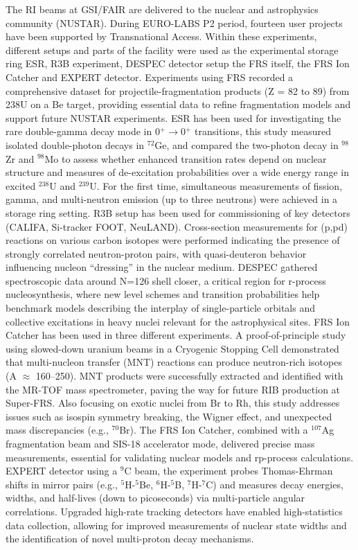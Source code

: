 The RI beams at GSI/FAIR are delivered to the nuclear and astrophysics community (NUSTAR). During EURO-LABS P2 period, fourteen user projects have been supported by Transnational Access. Within these experiments, different setups and parts of the facility were used as the experimental storage ring ESR, R3B experiment, DESPEC detector setup the FRS itself, the FRS Ion Catcher and EXPERT detector. Experiments using FRS recorded a comprehensive dataset for projectile-fragmentation products (Z = 82 to 89) from 238U on a Be target, providing essential data to refine fragmentation models and support future NUSTAR experiments. ESR has been used for investigating the rare double-gamma decay mode in 0$^+$$\rightarrow$0$^+$ transitions, this study measured isolated double-photon decays in $^{72}$Ge, and compared the two-photon decay in $^{98}$Zr and $^{98}$Mo to assess whether enhanced transition rates depend on nuclear structure and measures of de-excitation probabilities over a wide energy range in excited $^{238}$U and $^{239}$U. For the first time, simultaneous measurements of fission, gamma, and multi-neutron emission (up to three neutrons) were achieved in a storage ring setting. R3B setup has been used for commissioning of key detectors (CALIFA, Si-tracker FOOT, NeuLAND). Cross-section measurements for (p,pd) reactions on various carbon isotopes were performed indicating the presence of strongly correlated neutron-proton pairs, with quasi-deuteron behavior influencing nucleon “dressing” in the nuclear medium. DESPEC gathered spectroscopic data around N=126 shell closer, a critical region for r-process nucleosynthesis, where new level schemes and transition probabilities help benchmark models describing the interplay of single-particle orbitals and collective excitations in heavy nuclei relevant for the astrophysical sites. FRS Ion Catcher has been used in three different experiments. A proof-of-principle study using slowed-down uranium beams in a Cryogenic Stopping Cell demonstrated that multi-nucleon transfer (MNT) reactions can produce neutron-rich isotopes (A $\approx$ 160–250). MNT products were successfully extracted and identified with the MR-TOF mass spectrometer, paving the way for future RIB production at Super-FRS. Also focusing on exotic nuclei from Br to Rh, this study addresses issues such as isospin symmetry breaking, the Wigner effect, and unexpected mass discrepancies (e.g., $^{70}$Br). The FRS Ion Catcher, combined with a $^{107}$Ag fragmentation beam and SIS-18 accelerator mode, delivered precise mass measurements, essential for validating nuclear models and rp-process calculations. EXPERT detector using a $^9$C beam, the experiment probes Thomas-Ehrman shifts in mirror pairs (e.g., $^5$H-$^5$Be, $^6$H-$^5$B, $^7$H-$^7$C) and measures decay energies, widths, and half-lives (down to picoseconds) via multi-particle angular correlations. Upgraded high-rate tracking detectors have enabled high-statistics data collection, allowing for improved measurements of nuclear state widths and the identification of novel multi-proton decay mechanisms.


